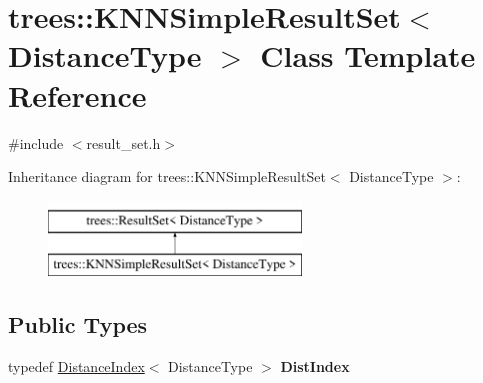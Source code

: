\hypertarget{classtrees_1_1_k_n_n_simple_result_set}{}\section{trees\+:\+:K\+N\+N\+Simple\+Result\+Set$<$ Distance\+Type $>$ Class Template Reference}
\label{classtrees_1_1_k_n_n_simple_result_set}


{\ttfamily \#include $<$result\+\_\+set.\+h$>$}

Inheritance diagram for trees\+:\+:K\+N\+N\+Simple\+Result\+Set$<$ Distance\+Type $>$\+:\begin{figure}[H]
\begin{center}
\leavevmode
\includegraphics[height=2.000000cm]{classtrees_1_1_k_n_n_simple_result_set}
\end{center}
\end{figure}
\subsection*{Public Types}
\begin{DoxyCompactItemize}
\item 
\mbox{\label{classtrees_1_1_k_n_n_simple_result_set_abca1d26dac81173b8e202660b8c8c9f1}} 
typedef \hyperlink{structtrees_1_1_distance_index}{Distance\+Index}$<$ Distance\+Type $>$ {\bfseries Dist\+Index}
\end{DoxyCompactItemize}
